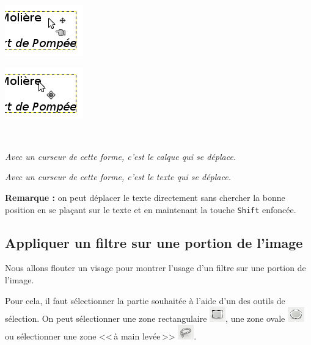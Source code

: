 \begin{minipage}[c]{.46\textwidth}
\centering%
\includegraphics[angle=0,width=.4\textwidth]{./images/image02/TexteCurseurBougePas}
\end{minipage}\hfill%
\begin{minipage}[c]{.46\textwidth}
\centering%
\includegraphics[angle=0,width=.4\textwidth]{./images/image02/TexteCurseurBouge}
\end{minipage}\\[12pt]
\begin{minipage}[c]{.46\textwidth}
{\small \emph{Avec un curseur de cette forme, c'est le calque qui se déplace.}}
\end{minipage}\hfill%
\begin{minipage}[c]{.46\textwidth}
{\small \emph{Avec un curseur de cette forme, c'est le texte qui se déplace.}}
\end{minipage}

\vspace{1em}

\textbf{Remarque :} on peut déplacer le texte directement sans chercher la bonne position en se plaçant sur le texte et en maintenant la touche \texttt{Shift} enfoncée.



\subsection{Appliquer un filtre sur une portion de l'image}\label{Gimp2AppliquerFiltre}

Nous allons flouter un visage pour montrer l'usage d'un filtre sur une portion de l'image.

Pour cela, il faut sélectionner la partie souhaitée à l'aide d'un des outils de sélection. On peut sélectionner une zone rectangulaire \includegraphics[width=.6cm]{./images/image02/iconeSelecRectangle}, une zone ovale \includegraphics[width=.6cm]{./images/image02/iconeSelecOvale} ou sélectionner une zone <<\,à main levée\,>> \includegraphics[width=.6cm]{./images/image02/iconeSelecLasso}.

